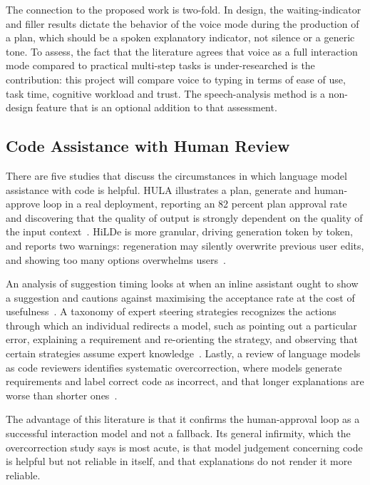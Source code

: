 \documentclass{FastFyp}
\begin{document}
The connection to the proposed work is two-fold. In design, the waiting-indicator and filler results dictate the behavior of the voice mode during the production of a plan, which should be a spoken explanatory indicator, not silence or a generic tone. To assess, the fact that the literature agrees that voice as a full interaction mode compared to practical multi-step tasks is under-researched is the contribution: this project will compare voice to typing in terms of ease of use, task time, cognitive workload and trust. The speech-analysis method is a non-design feature that is an optional addition to that assessment.

\subsection{Code Assistance with Human Review}
There are five studies that discuss the circumstances in which language model assistance with code is helpful. HULA illustrates a plan, generate and human-approve loop in a real deployment, reporting an 82 percent plan approval rate and discovering that the quality of output is strongly dependent on the quality of the input context~\cite{ref:takerngsaksiri2025}. HiLDe is more granular, driving generation token by token, and reports two warnings: regeneration may silently overwrite previous user edits, and showing too many options overwhelms users~\cite{ref:gonzalez2025}.

An analysis of suggestion timing looks at when an inline assistant ought to show a suggestion and cautions against maximising the acceptance rate at the cost of usefulness~\cite{ref:mozannar2024}. A taxonomy of expert steering strategies recognizes the actions through which an individual redirects a model, such as pointing out a particular error, explaining a requirement and re-orienting the strategy, and observing that certain strategies assume expert knowledge~\cite{ref:chidambaram2024}. Lastly, a review of language models as code reviewers identifies systematic overcorrection, where models generate requirements and label correct code as incorrect, and that longer explanations are worse than shorter ones~\cite{ref:jin2026}.

The advantage of this literature is that it confirms the human-approval loop as a successful interaction model and not a fallback. Its general infirmity, which the overcorrection study says is most acute, is that model judgement concerning code is helpful but not reliable in itself, and that explanations do not render it more reliable.
\end{document}
